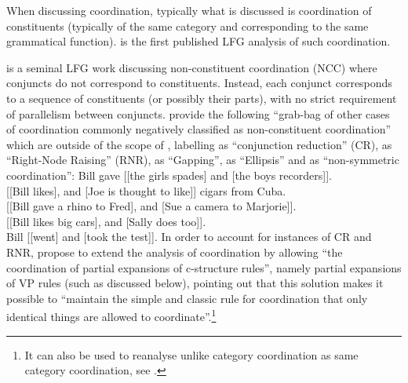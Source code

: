\documentclass[output=paper]{../langscibook}
\begin{document}
When discussing coordination, typically what is discussed is
coordination of constituents (typically of the same category and
corresponding to the same grammatical function). \citet{KaplanMaxwell1988:Coord}
is the first published LFG analysis of
such coordination.

\citet{max:man:96} is a seminal LFG work discussing non-constituent
coordination (NCC) where conjuncts do not correspond to
constituents. Instead, each conjunct corresponds to a sequence of
constituents (or possibly their parts), with no strict requirement of
parallelism between conjuncts.
%
\citet[1]{max:man:96} provide the following ``grab-bag of other cases
of coordination commonly negatively classified as non-constituent
coordination'' which are outside of the scope of \citet{KaplanMaxwell1988:Coord},
labelling  as ``conjunction
reduction'' (CR),  as ``Right-Node Raising'' (RNR),
 as ``Gapping'',  as
``Ellipsis'' and  as ``non-symmetric
coordination'':
\ea\label{ex:max:man:96:2a} Bill gave [[the girls spades] and [the boys recorders]].\\ \hspace*{\fill} \citep[(2a)]{max:man:96}\z
\ea\label{ex:max:man:96:2b} [[Bill likes], and [Joe is thought to like]] cigars from Cuba.\\ \hspace*{\fill} \citep[(2b)]{max:man:96}\z
\ea\label{ex:max:man:96:2c} [[Bill gave a rhino to Fred], and [Sue a camera to Marjorie]].\\ \hspace*{\fill} \citep[(2c)]{max:man:96}\z
\ea\label{ex:max:man:96:2d} [[Bill likes big cars], and [Sally does too]].\\  \hspace*{\fill}\citep[(2d)]{max:man:96}\z
\ea\label{ex:max:man:96:2e} Bill [[went] and [took the test]]. \hfill\citep[(2e)]{max:man:96}\z
In order to account for instances of CR and
RNR, \citet[3]{max:man:96} propose to extend the analysis of
coordination by allowing ``the coordination of partial expansions of
c-structure rules'', namely partial expansions of VP rules (such as
 discussed
below), pointing out that this solution makes it possible
to ``maintain the simple and classic rule for coordination that only
identical things are allowed to
coordinate''.\footnote{It can also be used to reanalyse unlike category coordination
as same category coordination, see .}
\end{document}
